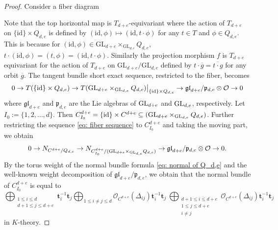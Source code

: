 \documentclass[10pt]{amsart}
\newcommand{\CO}{\mathcal{O}}
\newcommand{\bt}{\mathbf{t}}
\newcommand{\id}{\textnormal{id}}
\newcommand{\+}{{}^+}
\newcommand{\GL}{\textnormal{GL}}
\theoremstyle{definition}
\theoremstyle {definition}
\theoremstyle {definition}
\begin{document}
\begin{proof}
Consider a fiber diagram  
\begin{center}
\end{center}
Note that the top horizontal map is $T_{d+e}$-equivariant where the action of $T_{d+e}$ on $\{\mathrm{id} \}  \times Q_{d,e}$ is defined by $(\mathrm{id},\phi)\mapsto (\mathrm{id},t \cdot \phi)$ for any $t \in T$ and $\phi \in Q_{d,e}$. This is because for $(\mathrm{id},\phi) \in \mathrm{GL}_{d+e} \times _{\mathrm{GL}_{d,e}}Q_{d,e}$, $t\cdot(\mathrm{id},\phi) = (t,\phi) = (\mathrm{id}, t \cdot \phi)$. Similarly the projection morphism $f$ is $T_{d+e}$ equivariant for the action of $T_{d+e} $ on $\mathrm{GL}_{d+e}/\mathrm{GL}_{d,e}$ defined by $t \cdot \overline{g} = \overline{t\cdot g}$ for any orbit $\overline{g}$. The tangent bundle short exact sequence, restricted to the fiber, becomes
\begin{equation}\label{eq: fiber sequence}
    0\rightarrow T({\{\id\}\times Q_{d,e}})\rightarrow T(\GL_{d+e}\times_{\GL_{d,e}}Q_{d,e})\big|_{\{\id\}\times Q_{d,e}}\rightarrow \mathfrak{gl}_{d+e}/\mathfrak{p}_{d,e}\otimes \CO\rightarrow 0
\end{equation}
where $\mathfrak{gl}_{d+e}$ and $\mathfrak{p}_{d,e}$ are the Lie algebras of $\GL_{d+e}$ and $\GL_{d,e}$, respectively. Let $I_0:=\{1,2,\dots,d\}$. Then $C_{I_0}^{d+e}=\{\id\}\times C^{d+e}\subseteq (\GL_{d+e}\times_{\GL_{d,e}} Q_{d,e})$. Further restricting the sequence \eqref{eq: fiber sequence} to $C^{d+e}_{I_0}$ and taking the moving part, we obtain
$$0\rightarrow N_{C^{d+e}/Q_{d,e}}\rightarrow N_{C^{d+e}_{I_0}/(\GL_{d+e}\times_{\GL_{d,e}} Q_{d,e})}\rightarrow \mathfrak{gl}_{d+e}/\mathfrak{p}_{d,e}\otimes \CO\rightarrow 0. 
$$
By the torus weight of the normal bundle formula \eqref{eq: normal of Q_d,e} and the well-known weight decomposition of $\mathfrak{gl}_{d+e}/\mathfrak{p}_{d,e}$, we obtain that the normal bundle of $C^{d+e}_{I_0}$ is equal to  
\[ \bigoplus_{\substack{1 \leq i \leq d\\ d+1 \leq j \leq d+e}} \bt_i^{-1}\bt_j \bigoplus_{1 \leq i \neq j \leq d} \mathcal{O}_{C^{d+e}}(\Delta_{ij})\bt_{i}^{-1}\bt_{j} \ \bigoplus_{\substack{d+1 \leq i \leq d+e \\ 1 \leq j \leq d+e\\ i\neq j}} \mathcal{O}_{C^{d+e}}(\Delta_{ij}) \bt_{i}^{-1}\bt_{j} \] 
in $K$-theory.


\end{proof}
\end{document}
